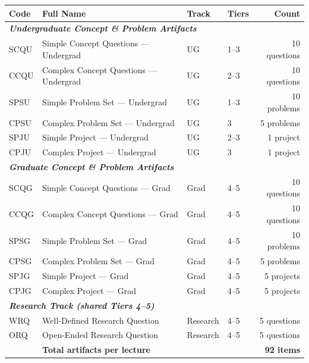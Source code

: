 \documentclass[11pt,a4paper]{article}
\begin{document}
\begin{center}
\begin{tabular}{llllr}
\toprule
\textbf{Code} & \textbf{Full Name} & \textbf{Track} & \textbf{Tiers} & \textbf{Count}\\
\midrule
\multicolumn{5}{l}{\textit{\textcolor{ugblue}{\textbf{Undergraduate Concept \& Problem Artifacts}}}}\\
SCQU & Simple Concept Questions --- Undergrad   & UG & 1--3 & 10 questions\\
CCQU & Complex Concept Questions --- Undergrad  & UG & 2--3 & 10 questions\\
SPSU & Simple Problem Set --- Undergrad         & UG & 1--3 & 10 problems\\
CPSU & Complex Problem Set --- Undergrad        & UG & 3    & 5 problems\\
SPJU & Simple Project --- Undergrad             & UG & 2--3 & 1 project\\
CPJU & Complex Project --- Undergrad            & UG & 3    & 1 project\\
\midrule
\multicolumn{5}{l}{\textit{\textcolor{gradred}{\textbf{Graduate Concept \& Problem Artifacts}}}}\\
SCQG & Simple Concept Questions --- Grad        & Grad & 4--5 & 10 questions\\
CCQG & Complex Concept Questions --- Grad       & Grad & 4--5 & 10 questions\\
SPSG & Simple Problem Set --- Grad              & Grad & 4--5 & 10 problems\\
CPSG & Complex Problem Set --- Grad             & Grad & 4--5 & 5 problems\\
SPJG & Simple Project --- Grad                  & Grad & 4--5 & 5 projects\\
CPJG & Complex Project --- Grad                 & Grad & 4--5 & 5 projects\\
\midrule
\multicolumn{5}{l}{\textit{\textcolor{respath}{\textbf{Research Track (shared Tiers 4--5)}}}}\\
WRQ  & Well-Defined Research Question           & Research & 4--5 & 5 questions\\
ORQ  & Open-Ended Research Question             & Research & 4--5 & 5 questions\\
\midrule
 & \multicolumn{3}{l}{\textbf{Total artifacts per lecture}} & \textbf{92 items}\\
\bottomrule
\end{tabular}
\end{center}
\end{document}
